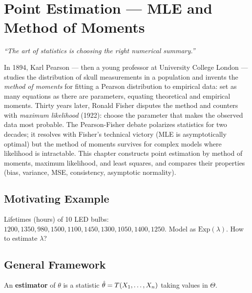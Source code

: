 \chapter{Point Estimation --- MLE and Method of Moments}
\label{ch:estimation}

\begin{center}
\textit{``The art of statistics is choosing the right numerical summary.''}
\end{center}

In 1894, Karl Pearson --- then a young professor at University College London --- studies the distribution of skull measurements in a population and invents the \emph{method of moments} for fitting a Pearson distribution to empirical data: set as many equations as there are parameters, equating theoretical and empirical moments. Thirty years later, Ronald Fisher disputes the method and counters with \emph{maximum likelihood} (1922): choose the parameter that makes the observed data most probable. The Pearson-Fisher debate polarizes statistics for two decades; it resolves with Fisher's technical victory (MLE is asymptotically optimal) but the method of moments survives for complex models where likelihood is intractable. This chapter constructs point estimation by method of moments, maximum likelihood, and least squares, and compares their properties (bias, variance, MSE, consistency, asymptotic normality).

\section{Motivating Example}

Lifetimes (hours) of 10 LED bulbs: $1200, 1350, 980, 1500, 1100, 1450, 1300, 1050, 1400, 1250$. Model as $\mathrm{Exp}(\lambda)$. How to estimate $\lambda$?

\section{General Framework}

\begin{definition}[Estimator]
An \textbf{estimator} of $\theta$ is a statistic $\hat{\theta} = T(X_1,\ldots,X_n)$ taking values in $\Theta$.
\end{definition}

